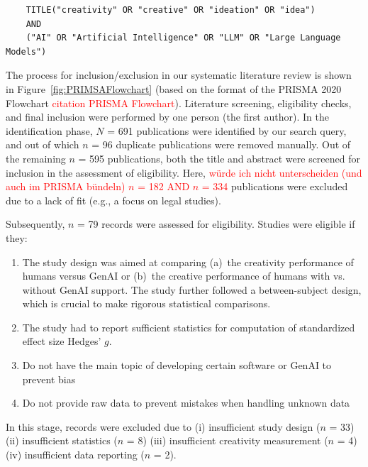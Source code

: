 \documentclass[manuscript, screen, review, acmsmall, anonymous]{acmart}
\newcommand{\TODO}[1]{\textcolor{red}{#1}}
\begin{document}
  \begin{tcolorbox}[
    enhanced,
    breakable,
    center upper, 
    colback=gray!10,
    colframe=gray!60!black,
    boxrule=0.8pt,
    arc=4pt,
    outer arc=4pt,
    drop shadow={black!50!white,opacity=0.3},
    width=\textwidth,
    fontupper=\footnotesize,
    title=\textbf{Search query}
  ]
    \begin{verbatim}
    TITLE("creativity" OR "creative" OR "ideation" OR "idea")
    AND
    ("AI" OR "Artificial Intelligence" OR "LLM" OR "Large Language Models")
    \end{verbatim}
  \end{tcolorbox}


The process for inclusion/exclusion in our systematic literature review is shown in Figure~\ref{fig:PRIMSAFlowchart} (based on the format of the PRISMA 2020 Flowchart \TODO{citation PRISMA Flowchart}). Literature screening, eligibility checks, and final inclusion were performed by one person (the first author). In the identification phase, $N$ = 691 publications were identified by our search query, and out of which $n$ = 96 duplicate publications were removed manually. Out of the remaining $n$ = 595 publications, both the title and abstract were screened for inclusion in the assessment of eligibility. Here, \TODO{würde ich nicht unterscheiden (und auch im PRISMA bündeln) $n$ = 182 AND $n$ = 334} publications were excluded due to a lack of fit (e.g., a focus on legal studies). 

Subsequently,  $n$ = 79 records were assessed for eligibility. Studies were eligible if they:
\begin{enumerate}
  \item The study design was aimed at comparing (a)~the creativity performance of humans versus GenAI or (b)~the creative performance of humans with vs. without GenAI support. The study further followed a between-subject design, which is crucial to make rigorous statistical comparisons. 
  \item The study had to report sufficient statistics for computation of standardized effect size Hedges’ $g$. 
  \item Do not have the main topic of developing certain software or GenAI to prevent bias
  \item Do not provide raw data to prevent mistakes when handling unknown data
\end{enumerate}
In this stage, records were excluded due to (i) insufficient study design ($n$ = 33) (ii) insufficient statistics ($n$ = 8) (iii) insufficient creativity measurement ($n$ = 4) (iv) insufficient data reporting ($n$ = 2). 
\end{document}
